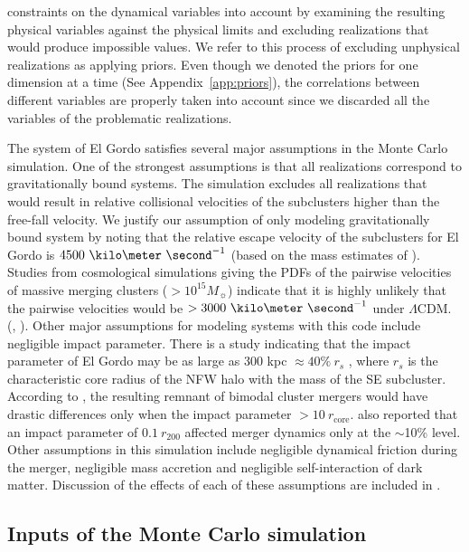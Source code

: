 constraints on the dynamical variables into account by
examining the resulting physical variables against the physical limits and
excluding realizations that would produce impossible values. We refer to this
process of excluding unphysical realizations as applying priors. 
Even though we denoted the priors for one dimension at a time (See Appendix~\ref{app:priors}), 
the correlations between different variables are properly taken into account
since we discarded all the variables of the problematic
realizations.\par 
The system of El Gordo satisfies several major assumptions in the Monte Carlo
simulation.
One of the strongest assumptions is that all realizations correspond to
gravitationally bound systems. The simulation excludes all realizations
that would result in relative collisional velocities of the subclusters
higher than the free-fall velocity. We justify our assumption of only
modeling gravitationally bound system by noting that the relative escape
velocity of the subclusters for El Gordo is
$4500~\kilo\meter~\second^{-1}$ (based on the mass estimates of
\cite{Jee13}). Studies from cosmological simulations giving the PDFs of the pairwise velocities of massive merging clusters ($>
10^{15} M_{\sun}$) indicate that it is highly unlikely that the pairwise
velocities would be $> 3000~\kilo \meter~\second^{-1}$ under $\Lambda$CDM.
(\citealt{Thompson12}, \citealt{Lee2010}).  Other major assumptions for
modeling systems with this code include negligible impact parameter. There
is a study indicating that the impact parameter of El Gordo
may be as large as $300$ kpc $ \approx 40\%~r_s$ \citep{Molnar14},
where $r_s$ is the characteristic core
radius of the NFW halo with the mass of the SE subcluster. According to
\cite{Ricker98}, the resulting remnant of bimodal cluster mergers would
have drastic differences only when the impact parameter $> 10~ r_{\text{core}}$.
\cite{Mastropietro2008a} also reported that an impact parameter of $0.1~
r_{200}$ affected merger dynamics only at the $\sim$10\% level.   
Other assumptions in this simulation include negligible dynamical friction
during the merger, negligible mass accretion and negligible self-interaction
of dark matter. Discussion of the effects of each of these assumptions are
included in .  
\par
\subsection{Inputs of the Monte Carlo simulation} \label{sec: inputs}
\setcounter{table}{0} 

